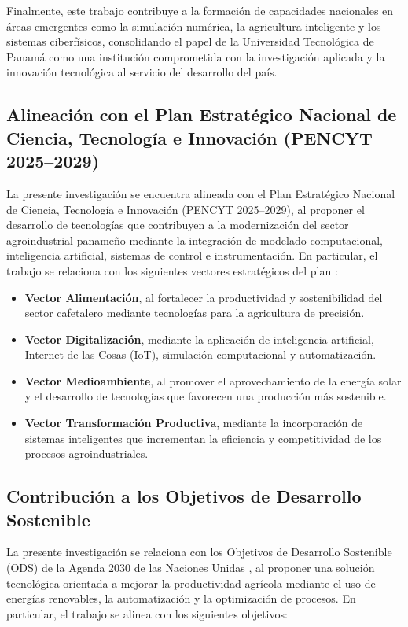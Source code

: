Finalmente, este trabajo contribuye a la formación de capacidades nacionales en áreas emergentes como la simulación numérica, la agricultura inteligente y los sistemas ciberfísicos, consolidando el papel de la Universidad Tecnológica de Panamá como una institución comprometida con la investigación aplicada y la innovación tecnológica al servicio del desarrollo del país.\\

\subsection{Alineación con el Plan Estratégico Nacional de Ciencia, Tecnología e Innovación (PENCYT 2025--2029)}

La presente investigación se encuentra alineada con el Plan Estratégico Nacional de Ciencia, Tecnología e Innovación (PENCYT 2025--2029), al proponer el desarrollo de tecnologías que contribuyen a la modernización del sector agroindustrial panameño mediante la integración de modelado computacional, inteligencia artificial, sistemas de control e instrumentación. En particular, el trabajo se relaciona con los siguientes vectores estratégicos del plan \parencite{senacyt2025}:

\begin{itemize}
\item \textbf{Vector Alimentación}, al fortalecer la productividad y sostenibilidad del sector cafetalero mediante tecnologías para la agricultura de precisión.

\item \textbf{Vector Digitalización}, mediante la aplicación de inteligencia artificial, Internet de las Cosas (IoT), simulación computacional y automatización.

\item \textbf{Vector Medioambiente}, al promover el aprovechamiento de la energía solar y el desarrollo de tecnologías que favorecen una producción más sostenible.

\item \textbf{Vector Transformación Productiva}, mediante la incorporación de sistemas inteligentes que incrementan la eficiencia y competitividad de los procesos agroindustriales.
\end{itemize}

\subsection{Contribución a los Objetivos de Desarrollo Sostenible}
La presente investigación se relaciona con los Objetivos de Desarrollo Sostenible (ODS) de la Agenda 2030 de las Naciones Unidas \parencite{onu2015}, al proponer una solución tecnológica orientada a mejorar la productividad agrícola mediante el uso de energías renovables, la automatización y la optimización de procesos. En particular, el trabajo se alinea con los siguientes objetivos:

